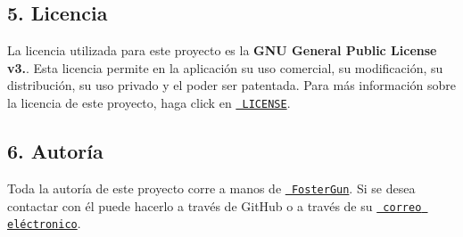 \begin{DoxyCode}{0}
\DoxyCodeLine{}
\end{DoxyCode}


\subsection*{5. Licencia}

La licencia utilizada para este proyecto es la {\bfseries{G\+NU General Public License v3.}}. Esta licencia permite en la aplicación su uso comercial, su modificación, su distribución, su uso privado y el poder ser patentada. Para más información sobre la licencia de este proyecto, haga click en \href{https://github.com/FosterGun/GAICurricula/blob/FosterGun/LICENSE}{\texttt{ L\+I\+C\+E\+N\+SE}}.

\subsection*{6. Autoría}

Toda la autoría de este proyecto corre a manos de \href{https://github.com/FosterGun}{\texttt{ Foster\+Gun}}. Si se desea contactar con él puede hacerlo a través de Git\+Hub o a través de su \href{mailto:mblanco040@ikasle.ehu.es}{\texttt{ correo eléctronico}}. 
